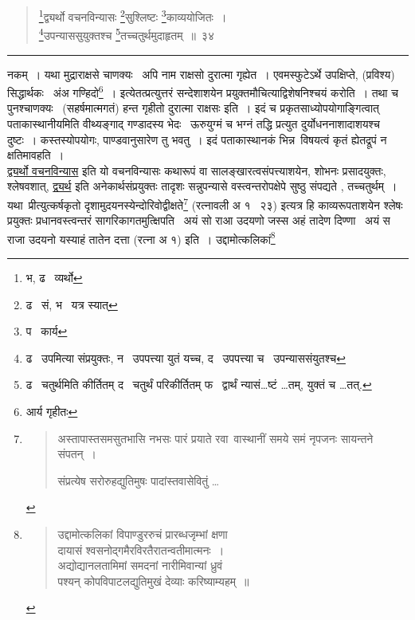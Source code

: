 \documentclass[11pt, openany]{book}
\begin{document}
\newpage

\begin{quote}
{\qt \renewcommand{\thefootnote}{1}\footnote{भ, ढ \textendash\ व्यर्थो}द्व्यर्थो वचनविन्यासः \renewcommand{\thefootnote}{2}\footnote{ढ \textendash\ सं, भ \textendash\ यत्र स्यात्}सुश्लिष्टः \renewcommand{\thefootnote}{3}\footnote{प \textendash\ कार्य}काव्ययोजितः~।\\
\renewcommand{\thefootnote}{4}\footnote{ढ \textendash\ उपमित्या संप्रयुक्तः, न \textendash\ उपपत्त्या युतं यच्च, द \textendash\ उपपत्त्या च \textendash\ उपन्याससंयुतश्च}उपन्याससुयुक्तश्च \renewcommand{\thefootnote}{5}\footnote{ढ \textendash\ चतुर्थमिति कीर्तितम् द \textendash\ चतुर्थं परिकीर्तितम् फ \textendash\ द्वार्थं न्यासं\ldots ष्टं \ldots तम्, युक्तं च \ldots तत्.}तच्चतुर्थमुदाहृतम्~॥~३४}
\end{quote}

\hrule

\vspace{2mm}
\noindent
नकम्~। यथा मुद्राराक्षसे चाणक्यः \textendash\ {\qt अपि नाम राक्षसो दुरात्मा गृह्येत}~। एवमस्फुटेऽर्थे उपक्षिप्ते, (प्रविश्य) सिद्धार्थकः \textendash\ {\qt अंअ गण्हिदो\renewcommand{\thefootnote}{*}\footnote{आर्य गृहीतः}}~। इत्येतत्प्रत्युत्तरं सन्देशाशयेन प्रयुक्तमौचित्याद्विशेषनिश्चयं करोति~। तथा च पुनश्चाणक्यः \textendash\ (सहर्षमात्मगतं) {\qt हन्त गृहीतो दुरात्मा राक्षसः} इति~। इदं च प्रकृतसाध्योपयोगाङ्गित्वात् पताकास्थानीयमिति वीथ्यङ्गाद् गण्डादस्य भेदः \textendash\ {\qt ऊरुयुग्मं च भग्नं} तद्धि प्रत्युत दुर्योधननाशादाशयश्च दुष्टः~। कस्तस्योपयोगः, पाण्डवानुसारेण तु भवतु~। इदं पताकास्थानकं भिन्न\textendash\ विषयत्वं कृतं ह्येतद्रूपं न क्षतिमावहति~।\\

\underline{द्व्यर्थो वचनविन्यास} इति यो वचनविन्यासः कथारूपं वा सालङ्खारत्वसंपत्त्याशयेन, शोभनः प्रसादयुक्तः, श्लेषवशात्, \underline{द्व्यर्थ} इति अनेकार्थसंप्रयुक्तः तादृशः सन्नुपन्यासे वस्त्वन्तरोपक्षेपे सुष्ठु संपद्यते , तच्चतुर्थम्~। यथा\textendash\ {\qt प्रीत्युत्कर्षकृतो दृशामुदयनस्येन्दोरिवोद्वीक्षते}\renewcommand{\thefootnote}{1}\footnote{\begin{quote}
{\qt अस्तापास्तसमसुतभासि नभसः पारं प्रयाते रवा\textendash\ 
वास्थानीं समये समं नृपजनः सायन्तने संपतन्~।

संप्रत्येष सरोरुहद्युतिमुषः पादांस्तवासेवितुं \ldots}
\end{quote}} (रत्नावली अ १ \textendash\ २३) इत्यत्र हि काव्यरूपताशयेन श्लेषः प्रयुक्तः प्रधानवस्त्वन्तरं सागरिकागतमुत्क्षिपति \textendash\ {\qt अयं सो राआ उदयणो जस्स अहं तादेण दिण्णा \textendash\ अयं स राजा उदयनो यस्याहं तातेन दत्ता} (रत्ना अ १) इति~। {\qt उद्दामोत्कलिकां}\renewcommand{\thefootnote}{2}\footnote{\begin{quote}
{\qt उद्दामोत्कलिकां विपाण्डुररुचं प्रारब्धजृम्भां क्षणा\textendash \\
दायासं श्वसनोद्गमैरविरतैरातन्वतीमात्मनः~।\\
अद्योद्यानलतामिमां समदनां नारीमिवान्यां ध्रुवं\\
पश्यन् कोपविपाटलद्युतिमुखं देव्याः करिष्याम्यहम्~॥}
\end{quote}}
\end{document}
